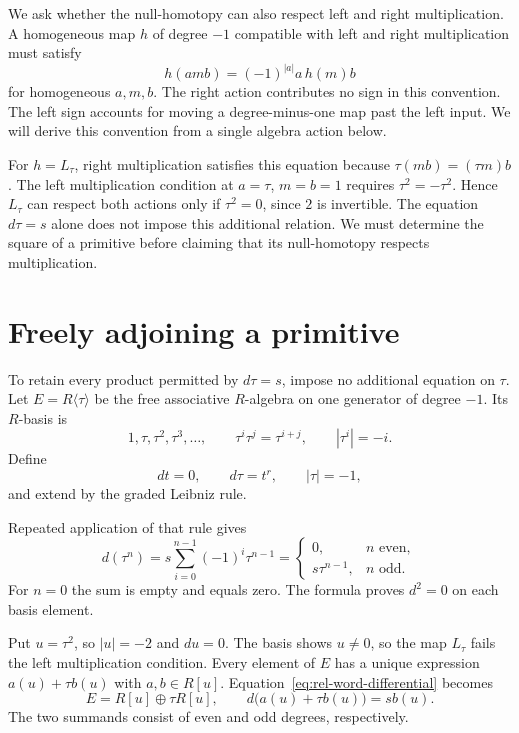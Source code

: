 We ask whether the null-homotopy can also respect left and right
multiplication. A homogeneous map $h$ of degree $-1$ compatible with left and
right multiplication must satisfy
\begin{equation}\label{eq:rel-homotopy-linearity}
 h(amb)=(-1)^{|a|}a\,h(m)b
\end{equation}
for homogeneous $a,m,b$. The right action contributes no sign in this
convention. The left sign accounts for moving a degree-minus-one map past
the left input. We will derive this convention from a single algebra
action below.

For $h=L_\tau$, right multiplication satisfies this equation because
$\tau(mb)=(\tau m)b$.
The left multiplication condition at $a=\tau$, $m=b=1$ requires
$\tau^2=-\tau^2$.
Hence $L_\tau$ can respect both actions only if $\tau^2=0$,
since $2$ is invertible.
The equation $d\tau=s$ alone does not impose this additional relation.
We must determine the square of a primitive before claiming that its
null-homotopy respects multiplication.

\section{Freely adjoining a primitive}
\label{sec:rel-algebra}

To retain every product permitted by $d\tau=s$, impose no additional
equation on $\tau$.
Let $E=R\langle\tau\rangle$ be the free associative $R$-algebra on one
generator of degree $-1$. Its $R$-basis is
\[
 1,\tau,\tau^2,\tau^3,\ldots,
 \qquad \tau^i\tau^j=\tau^{i+j},\qquad |\tau^i|=-i.
\]
Define
\begin{equation}\label{eq:rel-state-witness}
 dt=0,\qquad d\tau=t^r,\qquad |\tau|=-1,
\end{equation}
and extend by the graded Leibniz rule.

Repeated application of that rule gives
\begin{equation}\label{eq:rel-word-differential}
 d(\tau^n)
 =s\sum_{i=0}^{n-1}(-1)^i\tau^{n-1}
 =\begin{cases}
 0,&n\text{ even},\\
 s\tau^{n-1},&n\text{ odd}.
 \end{cases}
\end{equation}
For $n=0$ the sum is empty and equals zero.
The formula proves $d^2=0$ on each basis element.

Put $u=\tau^2$, so $|u|=-2$ and $du=0$.
The basis shows $u\ne0$, so the map $L_\tau$ fails the left
multiplication condition.
Every element of $E$ has a unique expression $a(u)+\tau b(u)$ with
$a,b\in R[u]$. Equation~\eqref{eq:rel-word-differential} becomes
\[
 E=R[u]\oplus\tau R[u],\qquad
 d\bigl(a(u)+\tau b(u)\bigr)=s b(u).
\]
The two summands consist of even and odd degrees, respectively.

